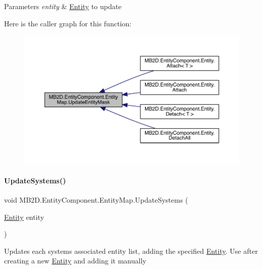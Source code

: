 \begin{DoxyParams}{Parameters}
{\em entity} & \hyperlink{class_m_b2_d_1_1_entity_component_1_1_entity}{Entity} to update\\
\hline
\end{DoxyParams}
Here is the caller graph for this function\+:
\nopagebreak
\begin{figure}[H]
\begin{center}
\leavevmode
\includegraphics[width=350pt]{class_m_b2_d_1_1_entity_component_1_1_entity_map_a968ce46cbba14cdc7814dd308f133949_icgraph}
\end{center}
\end{figure}
\hypertarget{class_m_b2_d_1_1_entity_component_1_1_entity_map_ab6078e0b6eddb220b9bbf5d358d6e365}{}\label{class_m_b2_d_1_1_entity_component_1_1_entity_map_ab6078e0b6eddb220b9bbf5d358d6e365} 
\paragraph{\texorpdfstring{Update\+Systems()}{UpdateSystems()}}
{\footnotesize\ttfamily void M\+B2\+D.\+Entity\+Component.\+Entity\+Map.\+Update\+Systems (\begin{DoxyParamCaption}\item[{\hyperlink{class_m_b2_d_1_1_entity_component_1_1_entity}{Entity}}]{entity }\end{DoxyParamCaption})\hspace{0.3cm}{\ttfamily [inline]}}



Updates each systems associated entity list, adding the specified \hyperlink{class_m_b2_d_1_1_entity_component_1_1_entity}{Entity}. Use after creating a new \hyperlink{class_m_b2_d_1_1_entity_component_1_1_entity}{Entity} and adding it manually 


